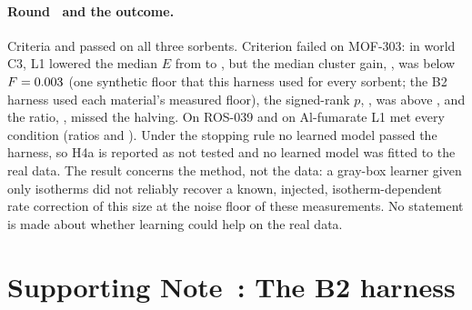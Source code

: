 \documentclass[11pt]{article}
\newcommand{\kpp}{k''}
\begin{document}
\paragraph{Round~ and the outcome.} Criteria  and  passed on all three sorbents. Criterion  failed on
MOF-303: in world C3, L1 lowered the median $E$ from  to , but the median
cluster gain, , was below $F = \V{si_mof_F}{0.003}$ (one synthetic floor that this harness
used for every sorbent; the B2 harness used each material's measured floor), the signed-rank $p$,
, was above , and the ratio, , missed the halving. On
ROS-039 and on Al-fumarate L1 met every condition (ratios  and ). Under
the stopping rule no learned model passed the harness, so H4a is reported as not tested and no learned model was
fitted to the real data. The result concerns the method, not the data: a gray-box learner given only isotherms did not
reliably recover a known, injected, isotherm-dependent rate correction of this size at the noise floor of these
measurements. No statement is made about whether learning could help on the real data.

{\small\setlength{\tabcolsep}{\ID{4.5pt}}
\setlength{\LTcapwidth}{\textwidth}
\newcommand{\TabHarnessCaption}{\caption{Harness record of the learned models (synthetic data). Median held-out error $E$ of the
learned model and of B0 refitted on the training sorbents, their ratio, the one-sided exact signed-rank $p$ (rounds
\ID{4} to \ID{7}; rounds \ID{1} and \ID{2} used a paired bootstrap, round~\ID{3} ran L2 in world N only), the beat by
the rule in force in that round, and in world N the largest relative error of the recovered $\kpp$ over the four
temperature--direction strata. \textsuperscript{a}The untouched fold: Al-fumarate held out with the same code and
seed.}\label{tab:harness}}

}

\section*{Supporting Note~: The B2 harness}
\end{document}

